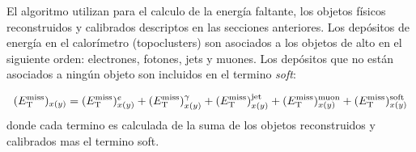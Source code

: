 El algoritmo utilizan para el calculo de la energía faltante, los objetos físicos
reconstruidos y calibrados descriptos en las secciones anteriores. Los depósitos
de energía en el calorímetro (topoclusters) son asociados a los objetos de alto
{\pt} en el siguiente orden: electrones, fotones, jets y muones. Los depósitos
que no están asociados a ningún objeto son incluidos en el termino \emph{soft}:

\begin{equation}
  (E_{\mathrm{T}}^{\mathrm{miss}})_{x(y)} = (E_{\mathrm{T}}^{\mathrm{miss}})^e_{x(y)} + (E_{\mathrm{T}}^{\mathrm{miss}})^\gamma_{x(y)}+(E_{\mathrm{T}}^{\mathrm{miss}})^\text{jet}_{x(y)}+(E_{\mathrm{T}}^{\mathrm{miss}})^\text{muon}_{x(y)}+(E_{\mathrm{T}}^{\mathrm{miss}})^\text{soft}_{x(y)}
\end{equation}
%
donde cada termino es calculada de la suma de los objetos reconstruidos y
calibrados mas el termino soft.



